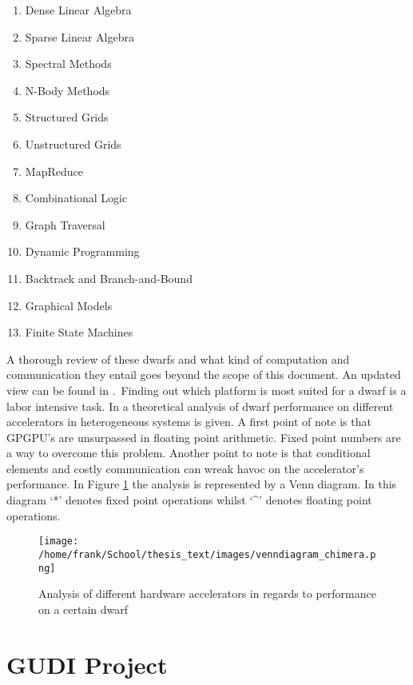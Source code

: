 \begin{multicols}{2}
\begin{enumerate}
\item Dense Linear Algebra
\item Sparse Linear Algebra
\item Spectral Methods
\item N-Body Methods
\item Structured Grids
\item Unstructured Grids
\item MapReduce
\item Combinational Logic
\item Graph Traversal
\item Dynamic Programming
\item Backtrack and Branch-and-Bound
\item Graphical Models
\item Finite State Machines
\end{enumerate}
\end{multicols}

A thorough review of these dwarfs and what kind of computation and communication they entail goes beyond the scope of this document. An updated view can be found in \cite{asanovic_view_2009}.\
Finding out which platform is most suited for a dwarf is a labor intensive task. In \cite{inta_chimera:_2012} a theoretical analysis of dwarf performance on different accelerators in heterogeneous systems is given. A first point of note is that GPGPU's are unsurpassed in floating point arithmetic. Fixed point numbers are a way to overcome this problem. Another point to note is that conditional elements and  costly communication can wreak havoc on the accelerator's performance. In Figure \ref{img:venndiagram_chimera} the analysis is represented by a Venn diagram. In this diagram `*' denotes fixed point operations whilst `\^{}' denotes floating point operations.

\begin{figure}[H]
\centering
\texttt{[image: /home/frank/School/thesis\_text/images/venndiagram\_chimera.png]}
\caption{Analysis of different hardware accelerators in regards to performance on a certain dwarf \cite{inta_chimera:_2012} }
\label{img:venndiagram_chimera}
\end{figure}


\section{GUDI Project}

